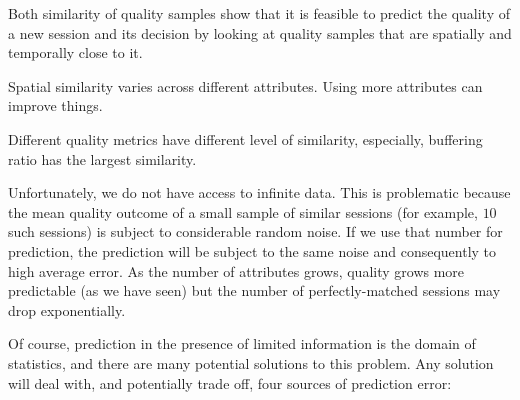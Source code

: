  
\begin{packedenumerate}
	\item Both similarity of quality samples show that it is feasible to predict the quality of a new session and its decision by looking at quality samples that are spatially and temporally close to it.
	\item Spatial similarity varies across different attributes.  Using more attributes can improve things.
	\item Different quality metrics have different level of similarity, especially, buffering ratio has the largest similarity.
\end{packedenumerate}

Unfortunately, we do not have access to infinite data.  This is problematic because the mean quality outcome of a small sample of similar sessions (for example, $10$ such sessions) is subject to considerable random noise.  If we use that number for prediction, the prediction will be subject to the same noise and consequently to high average error.  As the number of attributes grows, quality grows more predictable (as we have seen) but the number of perfectly-matched sessions may drop exponentially.

Of course, prediction in the presence of limited information is the domain of statistics, and there are many potential solutions to this problem.  Any solution will deal with, and potentially trade off, four sources of prediction error:


\begin{figure}[h!]
\centering
{}
\label{fig:group-size-impact}
\end{figure}

